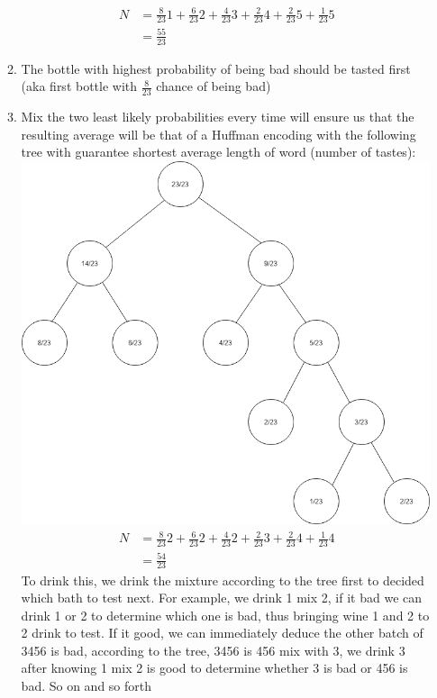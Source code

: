 \documentclass[12pt]{article}
\begin{document}
\begin{enumerate}
\begin{enumerate}
            \begin{align*}
                N &= \frac{8}{23}1 + \frac{6}{23}2 + \frac{4}{23}3 + \frac{2}{23}4 + \frac{2}{23}5 + \frac{1}{23}5\\
                &= \frac{55}{23}
            \end{align*}
            \item The bottle with highest probability of being bad should be tasted first (aka first bottle with $\frac{8}{23}$ chance of being bad)\\
            \item Mix the two least likely probabilities every time will ensure us that the resulting average will be that of a Huffman encoding with the following tree with guarantee shortest average length of word (number of tastes):\\
            \noindent
            \includegraphics[width=12cm]{HW2-Q5-3.png}
            \begin{align*}
                N &= \frac{8}{23}2 + \frac{6}{23}2 + \frac{4}{23}2 + \frac{2}{23}3 + \frac{2}{23}4 + \frac{1}{23}4\\
                &= \frac{54}{23}
            \end{align*}
            To drink this, we drink the mixture according to the tree first to decided which bath to test next. For example, we drink 1 mix 2, if it bad we can drink 1 or 2 to determine which one is bad, thus bringing wine 1 and 2 to 2 drink to test. If it good, we can immediately deduce the other batch of 3456 is bad, according to the tree, 3456 is 456 mix with 3, we drink 3 after knowing 1 mix 2 is good to determine whether 3 is bad or 456 is bad. So on and so forth

\end{enumerate}
\end{enumerate}
\end{document}

